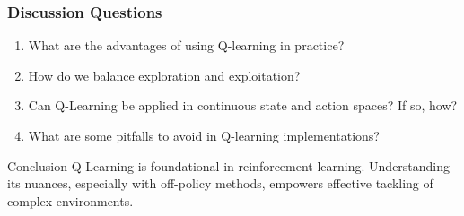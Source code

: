 \documentclass[aspectratio=169]{beamer}
\begin{document}
\begin{frame}[fragile]
    \frametitle{Discussion Questions}
    \begin{enumerate}
        \item What are the advantages of using Q-learning in practice?
        \item How do we balance exploration and exploitation?
        \item Can Q-Learning be applied in continuous state and action spaces? If so, how?
        \item What are some pitfalls to avoid in Q-learning implementations?
    \end{enumerate}
    \begin{block}{Conclusion}
        Q-Learning is foundational in reinforcement learning. Understanding its nuances, especially with off-policy methods, empowers effective tackling of complex environments.
    \end{block}
\end{frame}
\end{document}
